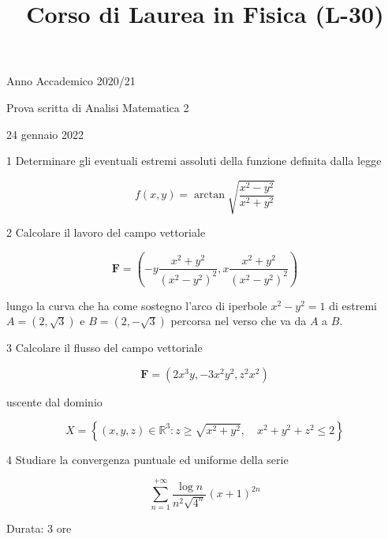 \documentclass[10pt]{article}
\title{Corso di Laurea in Fisica (L-30) }
\author{}
\date{}
\begin{document}
\maketitle
Anno Accademico 2020/21

Prova scritta di Analisi Matematica 2

24 gennaio 2022

1 Determinare gli eventuali estremi assoluti della funzione definita dalla legge

\[
f(x, y)=\arctan \sqrt{\frac{x^{2}-y^{2}}{x^{2}+y^{2}}}
\]

2 Calcolare il lavoro del campo vettoriale

\[
\mathbf{F}=\left(-y \frac{x^{2}+y^{2}}{\left(x^{2}-y^{2}\right)^{2}}, x \frac{x^{2}+y^{2}}{\left(x^{2}-y^{2}\right)^{2}}\right)
\]

lungo la curva che ha come sostegno l'arco di iperbole \(x^{2}-y^{2}=1\) di estremi \(A=(2, \sqrt{3})\) e \(B=(2,-\sqrt{3})\) percorsa nel verso che va da \(A\) a \(B\).

3 Calcolare il flusso del campo vettoriale

\[
\mathbf{F}=\left(2 x^{3} y,-3 x^{2} y^{2}, z^{2} x^{2}\right)
\]

uscente dal dominio

\[
X=\left\{(x, y, z) \in \mathbb{R}^{3}: z \geq \sqrt{x^{2}+y^{2}}, \quad x^{2}+y^{2}+z^{2} \leq 2\right\}
\]

4 Studiare la convergenza puntuale ed uniforme della serie

\[
\sum_{n=1}^{+\infty} \frac{\log n}{n^{2} \sqrt{4^{n}}}(x+1)^{2 n}
\]

Durata: 3 ore
\end{document}
